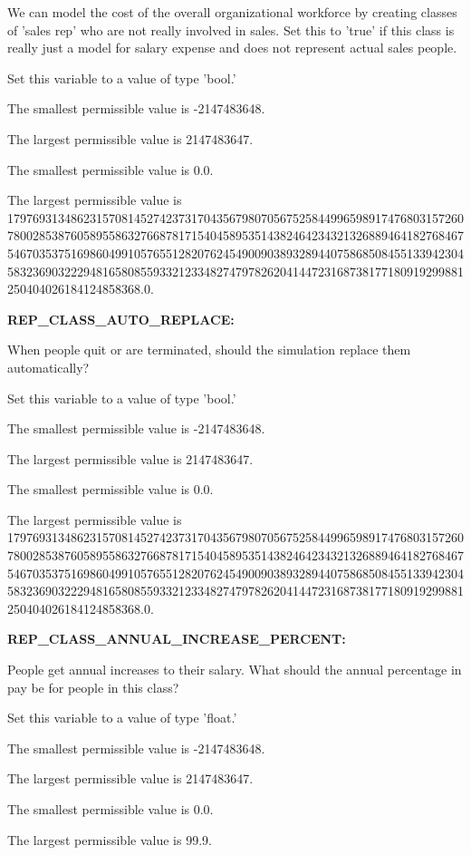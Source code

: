 We can model the cost of the overall organizational workforce by creating classes of 'sales rep' who are not really involved in sales.  Set this to 'true' if this class is really just a model for salary expense and does not represent actual sales people.

Set this variable to a value of type 'bool.'

The smallest permissible value is -2147483648.

The largest permissible value is 2147483647.

The smallest permissible value is 0.0.

The largest permissible value is 179769313486231570814527423731704356798070567525844996598917476803157260780028538760589558632766878171540458953514382464234321326889464182768467546703537516986049910576551282076245490090389328944075868508455133942304583236903222948165808559332123348274797826204144723168738177180919299881250404026184124858368.0.


\textbf{REP\_CLASS\_AUTO\_REPLACE:}


When people quit or are terminated, should the simulation replace them automatically?

Set this variable to a value of type 'bool.'

The smallest permissible value is -2147483648.

The largest permissible value is 2147483647.

The smallest permissible value is 0.0.

The largest permissible value is 179769313486231570814527423731704356798070567525844996598917476803157260780028538760589558632766878171540458953514382464234321326889464182768467546703537516986049910576551282076245490090389328944075868508455133942304583236903222948165808559332123348274797826204144723168738177180919299881250404026184124858368.0.


\textbf{REP\_CLASS\_ANNUAL\_INCREASE\_PERCENT:}


People get annual increases to their salary.  What should the annual percentage in pay be for people in this class?

Set this variable to a value of type 'float.'

The smallest permissible value is -2147483648.

The largest permissible value is 2147483647.

The smallest permissible value is 0.0.

The largest permissible value is 99.9.


